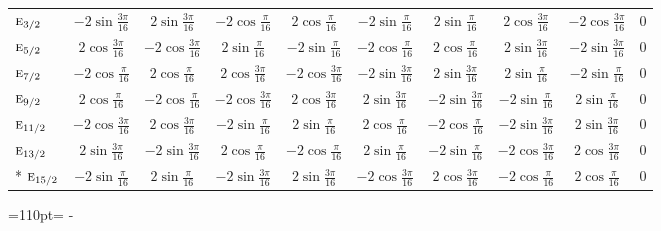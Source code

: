 \documentclass[10pt,a4paper]{article}
\newcommand{\needspace}[1]{\par\penalty-100\begingroup\dimen0=#1\relax\dimen2=\pagegoal
  \advance\dimen2-\pagetotal\ifdim\dimen0>\dimen2\relax\ifdim\dimen2>0pt\vfil\break\fi\fi
  \endgroup}
\numberwithin{equation}{section}
\newcommand{\irr}[1]{\text{\normalfont\scshape #1}}
\begin{document}
{{\begin{longtable}{@{}lccccccccc@{}}
$\irr{e}_{3/2}$ & $-2\sin\tfrac{3\pi}{16}$ & $2\sin\tfrac{3\pi}{16}$ & $-2\cos\tfrac{\pi}{16}$ & $2\cos\tfrac{\pi}{16}$ & $-2\sin\tfrac{\pi}{16}$ & $2\sin\tfrac{\pi}{16}$ & $2\cos\tfrac{3\pi}{16}$ & $-2\cos\tfrac{3\pi}{16}$ & $0$\\
$\irr{e}_{5/2}$ & $2\cos\tfrac{3\pi}{16}$ & $-2\cos\tfrac{3\pi}{16}$ & $2\sin\tfrac{\pi}{16}$ & $-2\sin\tfrac{\pi}{16}$ & $-2\cos\tfrac{\pi}{16}$ & $2\cos\tfrac{\pi}{16}$ & $2\sin\tfrac{3\pi}{16}$ & $-2\sin\tfrac{3\pi}{16}$ & $0$\\
$\irr{e}_{7/2}$ & $-2\cos\tfrac{\pi}{16}$ & $2\cos\tfrac{\pi}{16}$ & $2\cos\tfrac{3\pi}{16}$ & $-2\cos\tfrac{3\pi}{16}$ & $-2\sin\tfrac{3\pi}{16}$ & $2\sin\tfrac{3\pi}{16}$ & $2\sin\tfrac{\pi}{16}$ & $-2\sin\tfrac{\pi}{16}$ & $0$\\
$\irr{e}_{9/2}$ & $2\cos\tfrac{\pi}{16}$ & $-2\cos\tfrac{\pi}{16}$ & $-2\cos\tfrac{3\pi}{16}$ & $2\cos\tfrac{3\pi}{16}$ & $2\sin\tfrac{3\pi}{16}$ & $-2\sin\tfrac{3\pi}{16}$ & $-2\sin\tfrac{\pi}{16}$ & $2\sin\tfrac{\pi}{16}$ & $0$\\
$\irr{e}_{11/2}$ & $-2\cos\tfrac{3\pi}{16}$ & $2\cos\tfrac{3\pi}{16}$ & $-2\sin\tfrac{\pi}{16}$ & $2\sin\tfrac{\pi}{16}$ & $2\cos\tfrac{\pi}{16}$ & $-2\cos\tfrac{\pi}{16}$ & $-2\sin\tfrac{3\pi}{16}$ & $2\sin\tfrac{3\pi}{16}$ & $0$\\
$\irr{e}_{13/2}$ & $2\sin\tfrac{3\pi}{16}$ & $-2\sin\tfrac{3\pi}{16}$ & $2\cos\tfrac{\pi}{16}$ & $-2\cos\tfrac{\pi}{16}$ & $2\sin\tfrac{\pi}{16}$ & $-2\sin\tfrac{\pi}{16}$ & $-2\cos\tfrac{3\pi}{16}$ & $2\cos\tfrac{3\pi}{16}$ & $0$\\*
$\irr{e}_{15/2}$ & $-2\sin\tfrac{\pi}{16}$ & $2\sin\tfrac{\pi}{16}$ & $-2\sin\tfrac{3\pi}{16}$ & $2\sin\tfrac{3\pi}{16}$ & $-2\cos\tfrac{3\pi}{16}$ & $2\cos\tfrac{3\pi}{16}$ & $-2\cos\tfrac{\pi}{16}$ & $2\cos\tfrac{\pi}{16}$ & $0$\\
\bottomrule\end{longtable}}}
\needspace{110pt}
\end{document}
